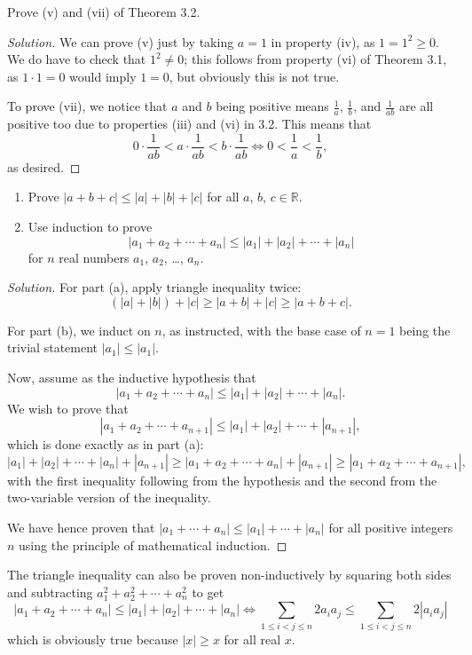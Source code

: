 \documentclass[11pt]{scrartcl}
\providecommand{\RR}{\mathbb R}
\providecommand{\ii}{\item}
\newenvironment{soln}{\begin{proof}[Solution]}{\end{proof}}
\begin{document}
\begin{problem*}[3.4]
	Prove (v) and (vii) of Theorem 3.2.
\end{problem*}
\begin{soln}
	We can prove (v) just by taking $a = 1$ in property (iv),
	as $1 = 1^2 \ge 0$. We do have to check that $1^2 \ne 0$;
	this follows from property (vi) of Theorem 3.1,
	as $1\cdot 1 = 0$ would imply $1 = 0$, but obviously this is not true.
	
	To prove (vii), we notice that $a$ and $b$ being positive means
	$\frac 1a$, $\frac 1b$, and $\frac 1{ab}$ are all positive too
	due to properties (iii) and (vi) in 3.2. This means that
	\[0\cdot \frac 1{ab} < a\cdot \frac 1{ab} < b\cdot \frac{1}{ab}
	\iff 0 < \frac 1a < \frac 1b,\]
	as desired.
\end{soln}

\begin{problem*}[3.6]\phantom{a}
	\begin{enumerate}[\textbf{(\alph*)}]
		\ii Prove $|a + b + c| \le |a| + |b| + |c|$
		for all $a$, $b$, $c\in \RR$.
		\ii Use induction to prove
		\[|a_1 + a_2 + \cdots + a_n| \le |a_1| + |a_2| + \cdots + |a_n|\]
		for $n$ real numbers $a_1$, $a_2$, \dots, $a_n$.
	\end{enumerate}
\end{problem*}
\begin{soln}
	For part (a), apply triangle inequality twice:
	\[(|a| + |b|) + |c| \ge |a + b| + |c| \ge |a + b + c|.\]
	
	For part (b), we induct on $n$, as instructed,
	with the base case of $n = 1$ being the trivial statement $|a_1|\le |a_1|$.
	
	Now, assume as the inductive hypothesis that
	\[|a_1 + a_2 + \cdots + a_n| \le |a_1| + |a_2| + \cdots + |a_n|.\]
	We wish to prove that
	\[|a_1 + a_2 + \cdots + a_{n+1}| \le |a_1| + |a_2| + \cdots + |a_{n+1}|,\]
	which is done exactly as in part (a):
	\[|a_1| + |a_2| + \cdots + |a_{n}| + |a_{n+1}| \ge
	|a_1 + a_2 + \cdots + a_n| + |a_{n+1}| \ge |a_1 + a_2 + \cdots + a_{n+1}|,\]
	with the first inequality following from the hypothesis
	and the second from the two-variable version of the inequality.
	
	We have hence proven that $|a_1 + \cdots + a_n| \le |a_1| + \cdots + |a_n|$
	for all positive integers $n$ using the principle of mathematical induction.
\end{soln}

\begin{remark*}
	The triangle inequality can also be proven non-inductively
	by squaring both sides and subtracting $a_1^2 + a_2^2 + \cdots + a_n^2$
	to get
	\[|a_1 + a_2 + \cdots + a_n| \le |a_1| + |a_2| + \cdots + |a_n|
	\iff \sum_{1 \le i < j \le n} 2a_ia_j \le \sum_{1\le i<j \le n} 2|a_ia_j|\]
	which is obviously true because $|x| \ge x$ for all real $x$.
\end{remark*}
\end{document}

